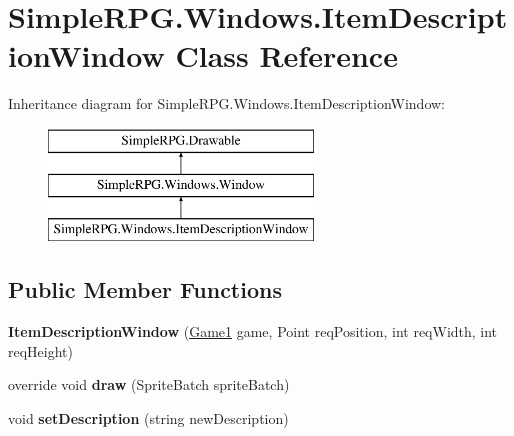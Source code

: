 \hypertarget{class_simple_r_p_g_1_1_windows_1_1_item_description_window}{\section{Simple\+R\+P\+G.\+Windows.\+Item\+Description\+Window Class Reference}
\label{class_simple_r_p_g_1_1_windows_1_1_item_description_window}
}
Inheritance diagram for Simple\+R\+P\+G.\+Windows.\+Item\+Description\+Window\+:\begin{figure}[H]
\begin{center}
\leavevmode
\includegraphics[height=3.000000cm]{class_simple_r_p_g_1_1_windows_1_1_item_description_window}
\end{center}
\end{figure}
\subsection*{Public Member Functions}
\begin{DoxyCompactItemize}
\item 
\hypertarget{class_simple_r_p_g_1_1_windows_1_1_item_description_window_a632484e7c47d19555b68a43c7ef314b1}{{\bfseries Item\+Description\+Window} (\hyperlink{class_simple_r_p_g_1_1_game1}{Game1} game, Point req\+Position, int req\+Width, int req\+Height)}\label{class_simple_r_p_g_1_1_windows_1_1_item_description_window_a632484e7c47d19555b68a43c7ef314b1}

\item 
\hypertarget{class_simple_r_p_g_1_1_windows_1_1_item_description_window_a5346e4574e7a29a3a09cbde41e523fbe}{override void {\bfseries draw} (Sprite\+Batch sprite\+Batch)}\label{class_simple_r_p_g_1_1_windows_1_1_item_description_window_a5346e4574e7a29a3a09cbde41e523fbe}

\item 
\hypertarget{class_simple_r_p_g_1_1_windows_1_1_item_description_window_aec5da8cb493b5960a6cda6d5ec10610d}{void {\bfseries set\+Description} (string new\+Description)}\label{class_simple_r_p_g_1_1_windows_1_1_item_description_window_aec5da8cb493b5960a6cda6d5ec10610d}

\end{DoxyCompactItemize}
